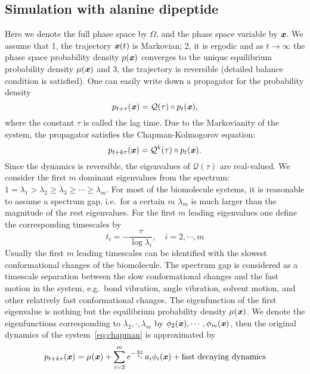 \documentclass[aip,jcp,a4paper,reprint,unsortedaddress,onecolumn,fleqn]{revtex4-1}
\newcommand{\vect}[1]{\textbf{\textit{#1}}}
\begin{document}
\subsection{Simulation with alanine dipeptide}

Here we denote the full phase space by $\Omega$, and the phase space
variable by $\vect x$. We assume that 1, the trajectory $\vect x(t)$
is Markovian; 2, it is ergodic and as $t\rightarrow\infty$ the phase
space probability density $p(\vect x)$ converges to the unique
equilibrium probability density $\mu(\vect x)$ and 3, the trajectory
is reversible (detailed balance condition is satisfied). One can
easily write down a propagator for the probability density
\begin{equation}
\label{eq:propagator}  
p_{t+\tau}(\vect x) = \mathcal Q(\tau)\circ
p_t(\vect x),
\end{equation}
where the constant $\tau$ is called the lag time. Due to the
Markovianity of the system, the propagator satisfies the
Chapman-Kolmogorov equation:
\begin{equation}
  \label{eq:chapman}
  p_{t+k\tau}(\vect x) = \mathcal Q^k(\tau)\circ p_t(\vect x).
\end{equation}
Since the dynamics is reversible, the eigenvalues of $\mathcal
Q(\tau)$ are real-valued. We consider the first $m$ dominant
eigenvalues from the spectrum: $1 = \lambda_1 > \lambda_2 \geq
\lambda_3 \geq \cdots \geq \lambda_m$. For most of the biomolecule
systems, it is reasonable to assume a spectrum gap, i.e.~for a certain
$m$ $\lambda_m$ is much larger than the magnitude of the rest
eigenvalues. For the first $m$ leading eigenvalues one define the
corresponding timescales by
\begin{equation}
  \label{eq:timescale}
  t_i = -\frac{\tau}{\log \lambda_i}, \quad i= 2,\cdots, m
\end{equation}
Usually the first $m$ leading timescales can be identified with the
slowest conformational changes of the biomolecule. The spectrum gap is
considered as a timescale separation between the slow conformational
changes and the fast motion in the system, e.g.~bond vibration, angle
vibration, solvent motion, and other relatively fast conformational
changes. The eigenfunction of the first eigenvalue is nothing but the
equilibrium probability density $\mu(\vect x)$. We denote the
eigenfunctions corresponding to $\lambda_2, \cdot, \lambda_m$ by
$\phi_2(\vect x), \cdots, \phi_m(\vect x)$, then the original dynamics
of the system~\eqref{eq:chapman} is approximated by
\begin{equation}
  \label{eq:app-dynamics}
  p_{t+k\tau}(\vect x) = \mu(\vect x) + \sum_{i=2}^m e^{-\frac{k\tau}{t_i}} a_i \phi_i(\vect x) + \textrm{fast decaying dynamics}
\end{equation}
\end{document}
